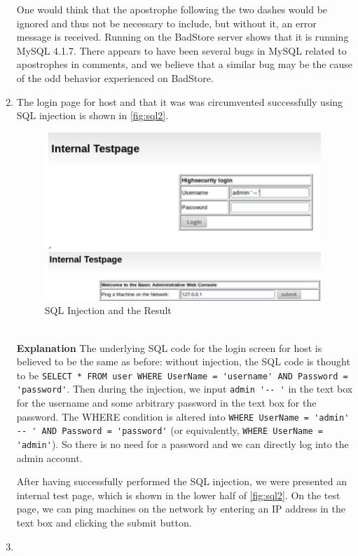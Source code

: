 \begin{enumerate}
One would think that the apostrophe following the two dashes would be ignored and thus not be necessary to include, but without it, an error message is received. Running  on the BadStore server shows that it is running MySQL 4.1.7. There appears to have been several bugs in MySQL related to apostrophes in comments\cite{quoteComment1}\cite{quoteComment2}, and we believe that a similar bug may be the cause of the odd behavior experienced on BadStore.
\item {}

The login page for host  and that it was was circumvented successfully using SQL injection is shown in \autoref{fig:sql2}.
\begin{figure}[h!]
	\caption{SQL Injection and the Result}
        \label{fig:sql2}
	\centering \includegraphics[height=2.5in]{sqli2}
\end{figure}
\\
  \textbf{Explanation} The underlying SQL code for the login screen for host  is believed to be the same as before: without injection, the SQL code is thought to be \lstinline{SELECT * FROM user WHERE UserName = 'username' AND Password = 'password'}. Then during the injection, we input \lstinline{admin '-- '} in the text box for the username and some arbitrary password in the text box for the password. The WHERE condition is altered into \lstinline{WHERE UserName = 'admin' -- ' AND Password = 'password'} (or equivalently, \lstinline{WHERE UserName = 'admin'}). So there is no need for a password and we can directly log into the admin account.

After having successfully performed the SQL injection, we were presented an internal test page, which is shown in the lower half of \autoref{fig:sql2}. On the test page, we can ping machines on the network by entering an IP address in the text box and clicking the submit button.
\item {}


\end{enumerate}
